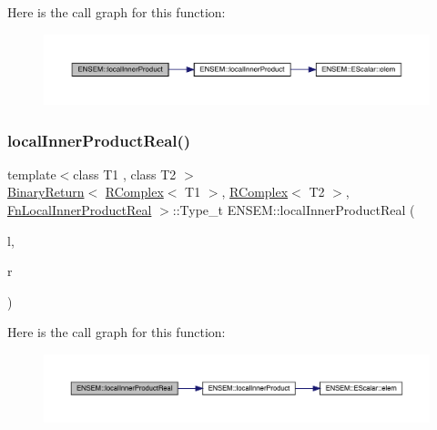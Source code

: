 Here is the call graph for this function\+:\nopagebreak
\begin{figure}[H]
\begin{center}
\leavevmode
\includegraphics[width=350pt]{da/dc7/group__rcomplex_ga4ccc8c0a3c54b7eb19e0d5aa1c6ac89d_cgraph}
\end{center}
\end{figure}
\mbox{\label{group__rcomplex_ga1480abb301211dfb7c0071739fce6a6a}} 
\subsubsection{\texorpdfstring{localInnerProductReal()}{localInnerProductReal()}}
{\footnotesize\ttfamily template$<$class T1 , class T2 $>$ \\
\mbox{\hyperlink{structENSEM_1_1BinaryReturn}{Binary\+Return}}$<$ \mbox{\hyperlink{classENSEM_1_1RComplex}{R\+Complex}}$<$ T1 $>$, \mbox{\hyperlink{classENSEM_1_1RComplex}{R\+Complex}}$<$ T2 $>$, \mbox{\hyperlink{structENSEM_1_1FnLocalInnerProductReal}{Fn\+Local\+Inner\+Product\+Real}} $>$\+::Type\+\_\+t E\+N\+S\+E\+M\+::local\+Inner\+Product\+Real (\begin{DoxyParamCaption}\item[{const \mbox{\hyperlink{classENSEM_1_1RComplex}{R\+Complex}}$<$ T1 $>$ \&}]{l,  }\item[{const \mbox{\hyperlink{classENSEM_1_1RComplex}{R\+Complex}}$<$ T2 $>$ \&}]{r }\end{DoxyParamCaption})\hspace{0.3cm}{\ttfamily [inline]}}

Here is the call graph for this function\+:\nopagebreak
\begin{figure}[H]
\begin{center}
\leavevmode
\includegraphics[width=350pt]{da/dc7/group__rcomplex_ga1480abb301211dfb7c0071739fce6a6a_cgraph}
\end{center}
\end{figure}
\mbox{\label{group__rcomplex_gaeb6b484f4bb6decc4552e2c635452b3f}} 
